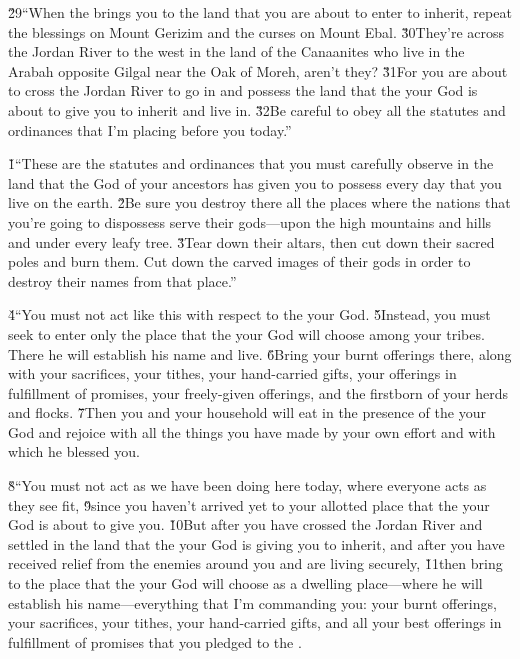 \v{29}``When the  brings you to the land that you are about to enter to inherit, repeat the blessings on Mount Gerizim and the curses on Mount Ebal. \v{30}They're across the Jordan River to the west in the land of the Canaanites who live in the Arabah opposite Gilgal near the Oak of Moreh, aren't they? \v{31}For you are about to cross the Jordan River to go in and possess the land that the  your God is about to give you to inherit and live in. \v{32}Be careful to obey all the statutes and ordinances that I'm placing before you today.''

\v{1}``These are the statutes and ordinances that you must carefully observe in the land that the  God of your ancestors has given you to possess every day that you live on the earth. \v{2}Be sure you destroy there all the places where the nations that you're going to dispossess serve their gods---upon the high mountains and hills and under every leafy tree. \v{3}Tear down their altars, then cut down their sacred poles and burn them. Cut down the carved images of their gods in order to destroy their names from that place.''

\v{4}``You must not act like this with respect to the  your God. \v{5}Instead, you must seek to enter only the place that the  your God will choose among your tribes. There he will establish his name and live. \v{6}Bring your burnt offerings there, along with your sacrifices, your tithes, your hand-carried gifts, your offerings in fulfillment of promises, your freely-given offerings, and the firstborn of your herds and flocks. \v{7}Then you and your household will eat in the presence of the  your God and rejoice with all the things you have made by your own effort and with which he blessed you.

\v{8}``You must not act as we have been doing here today, where everyone acts as they see fit, \v{9}since you haven't arrived yet to your allotted place that the  your God is about to give you. \v{10}But after you have crossed the Jordan River and settled in the land that the  your God is giving you to inherit, and after you have received relief from the enemies around you and are living securely, \v{11}then bring to the place that the  your God will choose as a dwelling place---where he will establish his name---everything that I'm commanding you: your burnt offerings, your sacrifices, your tithes, your hand-carried gifts, and all your best offerings in fulfillment of promises that you pledged to the .

